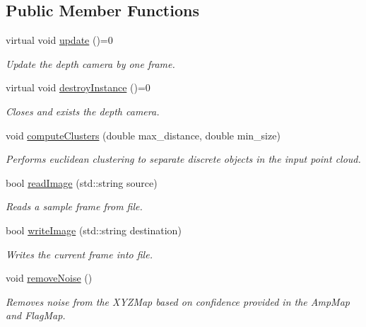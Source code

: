 \subsection*{Public Member Functions}
\begin{DoxyCompactItemize}
\item 
virtual void \hyperlink{class_depth_camera_abae1b9f37a00b17f00ff983ebb43ffc5}{update} ()=0
\begin{DoxyCompactList}\small\item\em Update the depth camera by one frame. \end{DoxyCompactList}\item 
virtual void \hyperlink{class_depth_camera_aaf7c09a863e906f61104f23af10a8597}{destroy\+Instance} ()=0
\begin{DoxyCompactList}\small\item\em Closes and exists the depth camera. \end{DoxyCompactList}\item 
void \hyperlink{class_depth_camera_a009719ec313de883b617903360bdf519}{compute\+Clusters} (double max\+\_\+distance, double min\+\_\+size)
\begin{DoxyCompactList}\small\item\em Performs euclidean clustering to separate discrete objects in the input point cloud. \end{DoxyCompactList}\item 
bool \hyperlink{class_depth_camera_a21cf887a447d2cdfda6ac907662c55fe}{read\+Image} (std\+::string source)
\begin{DoxyCompactList}\small\item\em Reads a sample frame from file. \end{DoxyCompactList}\item 
bool \hyperlink{class_depth_camera_a599dceaab9e673762b9ab76cf1e4f413}{write\+Image} (std\+::string destination)
\begin{DoxyCompactList}\small\item\em Writes the current frame into file. \end{DoxyCompactList}\item 
void \hyperlink{class_depth_camera_adc06db6509cc5f47de1e168f56bf41fa}{remove\+Noise} ()
\begin{DoxyCompactList}\small\item\em Removes noise from the X\+Y\+Z\+Map based on confidence provided in the Amp\+Map and Flag\+Map. \end{DoxyCompactList}\item 

\end{DoxyCompactItemize}
